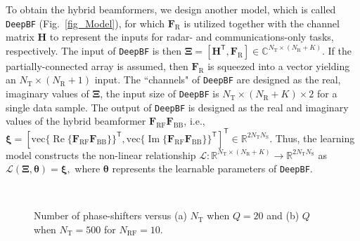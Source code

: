 \documentclass[journal,10pt]{IEEEtran}
\begin{document}
	To obtain the hybrid beamformers, we design another model, which is called \texttt{DeepBF} (Fig.~\ref{fig_Model}), for which $\mathbf{F}_\mathrm{R}$ is utilized together with the channel matrix $\mathbf{H}$   to represent the inputs for  radar- and communications-only tasks, respectively. The input of \texttt{DeepBF} is then $\boldsymbol{\Xi} = [\mathbf{H}^\textsf{T},\mathbf{F}_\mathrm{R}]\in \mathbb{C}^{N_\mathrm{T}\times (N_\mathrm{R} +K)}$. If the partially-connected array is assumed, then $\mathbf{F}_\mathrm{R}$ is squeezed into a vector yielding an ${N_\mathrm{T}\times (N_\mathrm{R} +1)}$ input. The ``channels" of \texttt{DeepBF} are designed as the real, imaginary values of $\boldsymbol{\Xi}$, the input size of \texttt{DeepBF} is ${N_\mathrm{T}\times (N_\mathrm{R} +K)\times 2}$ for a single data sample. The output of \texttt{DeepBF} is designed as the real and imaginary values of the hybrid beamformer  $\mathbf{F}_\mathrm{RF}\mathbf{F}_\mathrm{BB}$, i.e., $\boldsymbol{\xi} = [\mathrm{vec}\{\operatorname{Re}\{\mathbf{F}_\mathrm{RF}\mathbf{F}_\mathrm{BB}\}\}^\textsf{T}, \mathrm{vec}\{\operatorname{Im}\{\mathbf{F}_\mathrm{RF}\mathbf{F}_\mathrm{BB}\}\}^\textsf{T}]^\textsf{T}\in \mathbb{R}^{2N_\mathrm{T}N_\mathrm{S}}$. Thus, the learning model constructs the non-linear relationship $\mathcal{L} : \mathbb{R}^{{N_\mathrm{T}\times (N_\mathrm{R} +K)}} \rightarrow \mathbb{R}^{2N_\mathrm{T}N_\mathrm{S}} $ as $	\mathcal{L}(\boldsymbol{\Xi}, \boldsymbol{\theta}) = \boldsymbol{\xi},$	where $\boldsymbol{\theta}$ represents the learnable parameters of \texttt{DeepBF}.
	
	
	
	
	
	\begin{figure}[t]
		\centering
		 \\
		\caption{Number of phase-shifters versus (a) $N_\mathrm{T}$ when $Q=20$ and (b) $Q$ when $N_\mathrm{T} = 500$ for $N_\mathrm{RF} = 10$.  
		}
		\label{fig_NumPhaseShift}
	\end{figure}
	
	
	
\end{document}
